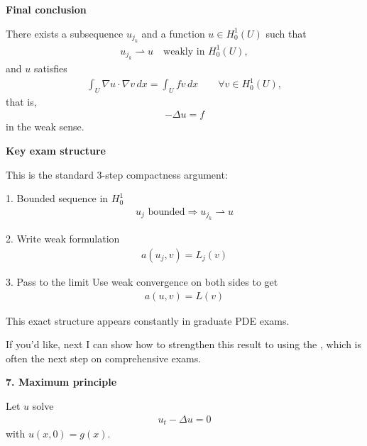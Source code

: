 \documentclass[12pt,a4paper]{report}
\begin{document}
\begin{description}
\begin{description}
\item \textbf{Final conclusion}

There exists a subsequence $u_{j_k}$ and a function $u\in H_0^1(U)$ such that
\begin{align*}
u_{j_k}\rightharpoonup u
\quad\text{weakly in }H_0^1(U),
\end{align*}
and $u$ satisfies
\begin{align*}
\boxed{
\int_U \nabla u\cdot\nabla v\,dx = \int_U fv\,dx \qquad\forall v\in H_0^1(U),
}
\end{align*}
that is,
\begin{align*}
\boxed{-\Delta u=f}
\end{align*}
in the weak sense.

\item \textbf{Key exam structure}

This is the standard 3-step compactness argument:

	\begin{description}
        \item 1. Bounded sequence in $H_0^1$
\begin{align*}
u_j \text{ bounded}
\Rightarrow
u_{j_k}\rightharpoonup u
\end{align*}

        \item 2. Write weak formulation
\begin{align*}
a(u_j,v)=L_j(v)
\end{align*}

        \item 3. Pass to the limit
Use weak convergence on both sides to get
\begin{align*}
a(u,v)=L(v)
\end{align*}

		\end{description}

This exact structure appears constantly in graduate PDE exams.
\end{description}

If you'd like, next I can show how to strengthen this result to  using the , which is often the next step on comprehensive exams.


\newpage\item \textbf{7. Maximum principle}

Let $u$ solve
\begin{align*}
u_t-\Delta u=0
\end{align*}
with $u(x,0)=g(x)$.


\end{description}
\end{document}
